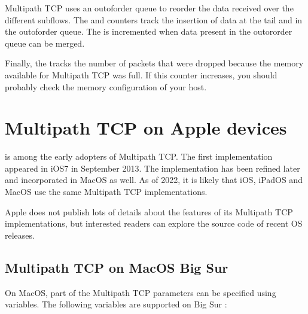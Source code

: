\documentclass[letterpaper,10pt,english]{sphinxmanual}
\begin{document}
\sphinxAtStartPar
Multipath TCP uses an out\sphinxhyphen{}of\sphinxhyphen{}order queue to reorder the data received over
the different subflows. The  and    counters track the insertion of data at the tail and in the out\sphinxhyphen{}of\sphinxhyphen{}order
queue. The  is incremented when data present in the
out\sphinxhyphen{}or\sphinxhyphen{}order queue can be merged.

\sphinxAtStartPar
Finally, the  tracks the number of packets that
were dropped because the memory available for Multipath TCP was full.
If this counter increases, you should probably check the memory configuration
of your host.


\chapter{Multipath TCP on Apple devices}
\label{\detokenize{mptcp-apple:multipath-tcp-on-apple-devices}}\label{\detokenize{mptcp-apple::doc}}
\sphinxAtStartPar
{} is among the early adopters of Multipath TCP.
The first implementation appeared in iOS7 in September 2013. The implementation has been refined later and incorporated in MacOS as well. As of 2022, it is likely that iOS, iPadOS and MacOS use the same Multipath TCP implementations.

\sphinxAtStartPar
Apple does not publish lots of details about the features of its Multipath TCP implementations, but interested readers can explore the source code of recent OS releases.


\section{Multipath TCP on MacOS Big Sur}
\label{\detokenize{mptcp-apple:multipath-tcp-on-macos-big-sur}}
\sphinxAtStartPar
On MacOS, part of the Multipath TCP parameters can be specified using  variables. The following variables are supported on Big Sur :
\end{document}

